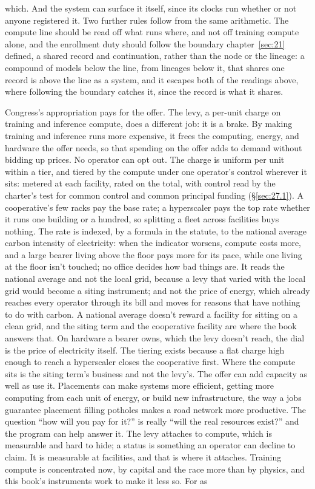 which. And the system can surface it itself, since its clocks run whether or not anyone registered it. Two further rules follow from the same arithmetic. The compute line should be read off what runs where, and not off training compute alone, and the enrollment duty should follow the boundary chapter~\ref{sec:21} defined, a shared record and continuation, rather than the node or the lineage: a compound of models below the line, from lineages below it, that shares one record is above the line as a system, and it escapes both of the readings above, where following the boundary catches it, since the record is what it shares.


Congress's appropriation pays for the offer. The levy, a per-unit charge on training and inference compute, does a different job: it is a brake. By making training and inference runs more expensive, it frees the computing, energy, and hardware the offer needs, so that spending on the offer adds to demand without bidding up prices. No operator can opt out. The charge is uniform per unit within a tier, and tiered by the compute under one operator's control wherever it sits: metered at each facility, rated on the total, with control read by the charter's test for common control and common principal funding (\S\ref{sec:27.1}). A cooperative's few racks pay the base rate; a hyperscaler pays the top rate whether it runs one building or a hundred, so splitting a fleet across facilities buys nothing. The rate is indexed, by a formula in the statute, to the national average carbon intensity of electricity: when the indicator worsens, compute costs more, and a large bearer living above the floor pays more for its pace, while one living at the floor isn't touched; no office decides how bad things are. It reads the national average and not the local grid, because a levy that varied with the local grid would become a siting instrument; and not the price of energy, which already reaches every operator through its bill and moves for reasons that have nothing to do with carbon. A national average doesn't reward a facility for sitting on a clean grid, and the siting term and the cooperative facility are where the book answers that. On hardware a bearer owns, which the levy doesn't reach, the dial is the price of electricity itself. The tiering exists because a flat charge high enough to reach a hyperscaler closes the cooperative first. Where the compute sits is the siting term's business and not the levy's. The offer can add capacity as well as use it. Placements can make systems more efficient, getting more computing from each unit of energy, or build new infrastructure, the way a jobs guarantee placement filling potholes makes a road network more productive. The question “how will you pay for it?” is really “will the real resources exist?” and the program can help answer it. The levy attaches to compute, which is measurable and hard to hide; a status is something an operator can decline to claim. It is measurable at facilities, and that is where it attaches. Training compute is concentrated now, by capital and the race more than by physics, and this book's instruments work to make it less so. For as 
